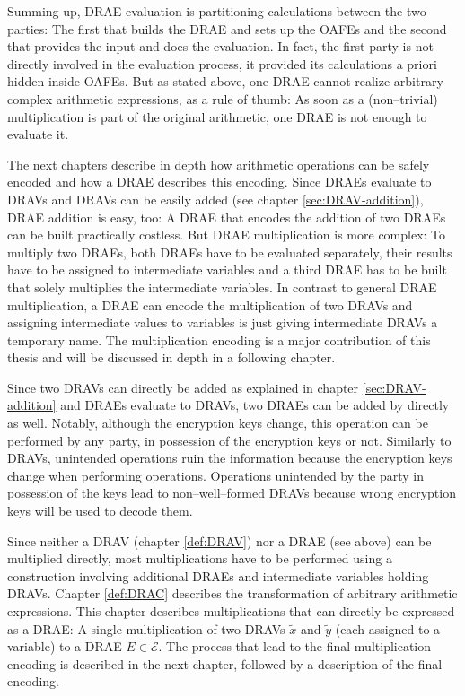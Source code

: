Summing up, DRAE evaluation is partitioning calculations between the two
parties: The first that builds the DRAE and sets up the OAFEs and the second
that provides the input and does the evaluation. In fact, the first party is not
directly involved in the evaluation process, it provided its calculations a
priori hidden inside OAFEs. But as stated above, one DRAE cannot realize
arbitrary complex arithmetic expressions, as a rule of thumb: As soon as a
(non--trivial) multiplication is part of the original arithmetic, one DRAE is
not enough to evaluate it.

The next chapters describe in depth how arithmetic operations can be safely
encoded and how a DRAE describes this encoding. Since DRAEs evaluate to DRAVs
and DRAVs can be easily added (see chapter \ref{sec:DRAV-addition}), DRAE
addition is easy, too: A DRAE that encodes the addition of two DRAEs can be
built practically costless. But DRAE multiplication is more complex: To multiply
two DRAEs, both DRAEs have to be evaluated separately, their results have to be
assigned to intermediate variables and a third DRAE has to be built that solely
multiplies the intermediate variables. In contrast to general DRAE
multiplication, a DRAE can encode the multiplication of two DRAVs and assigning
intermediate values to variables is just giving intermediate DRAVs a temporary
name. The multiplication encoding is a major contribution of this thesis and
will be discussed in depth in a following chapter.


\label{sec:enc-adds}

Since two DRAVs can directly be added as explained in chapter
\ref{sec:DRAV-addition} and DRAEs evaluate to DRAVs, two DRAEs can be added by
directly as well. Notably, although the encryption keys change, this operation
can be performed by any party, in possession of the encryption keys or not.
Similarly to DRAVs, unintended operations ruin the information because the
encryption keys change when performing operations. Operations unintended by the
party in possession of the keys lead to non--well--formed DRAVs because wrong
encryption keys will be used to decode them.


\label{sec:enc-muls}

Since neither a DRAV (chapter \ref{def:DRAV}) nor a DRAE (see above) can be
multiplied directly, most multiplications have to be performed using a
construction involving additional DRAEs and intermediate variables holding
DRAVs. Chapter \ref{def:DRAC} describes the transformation of arbitrary
arithmetic expressions. This chapter describes multiplications that can directly
be expressed as a DRAE: A single multiplication of two DRAVs $\widetilde{x}$ and
$\widetilde{y}$ (each assigned to a variable) to a DRAE $E \in \mathcal{E}$. The
process that lead to the final multiplication encoding is described in the
next chapter, followed by a description of the final encoding.


